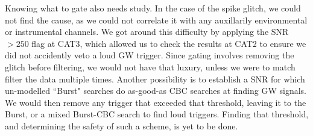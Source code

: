 Knowing what to gate also needs study. In the case of the spike glitch, we
could not find the cause, as we could not correlate it with any auxillarily
environmental or instrumental channels. We got around this difficulty by
applying the \ac{SNR} $> 250$ flag at CAT3, which allowed us to check the
results at CAT2 to ensure we did not accidently veto a loud \ac{GW} trigger.
Since gating involves removing the glitch before filtering, we would not have
that luxury, unless we were to match filter the data multiple times. Another
possibility is to establish a \ac{SNR} for which un-modelled ``Burst" searches
do as-good-as \ac{CBC} searches at finding \ac{GW} signals. We would then
remove any trigger that exceeded that threshold, leaving it to the Burst, or a
mixed Burst-\ac{CBC} search to find loud triggers.  Finding that threshold, and
determining the safety of such a scheme, is yet to be done.

